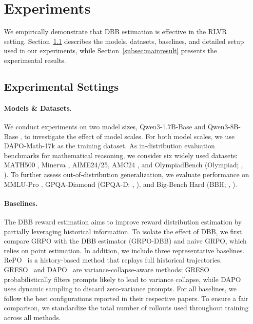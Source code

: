 \section{Experiments}
We empirically demonstrate that DBB estimation is effective in the RLVR setting. Section~\ref{subsec:expsetting} describes the models, datasets, baselines, and detailed setup used in our experiments, while Section~\ref{subsec:mainresult} presents the experimental results.

\subsection{Experimental Settings}
\label{subsec:expsetting}

\paragraph{Models \& Datasets.}
We conduct experiments on two model sizes, Qwen3-1.7B-Base and Qwen3-8B-Base \cite{yang2025qwen3technicalreport}, to investigate the effect of model scales.
For both model scales, we use DAPO-Math-17k \cite{yu2025dapoopensourcellmreinforcement} as the training dataset.
As in-distribution evaluation benchmarks for mathematical reasoning, we consider six widely used datasets: MATH500 \cite{math500}, Minerva \cite{minerva}, AIME24/25, AMC24 \cite{li2024numinamath}, and OlympiadBench (Olympiad; \citeauthor{olympiad}, \citeyear{olympiad}).
To further assess out-of-distribution generalization, we evaluate performance on MMLU-Pro \cite{mmlupro}, GPQA-Diamond (GPQA-D; \citeauthor{gpqa}, \citeyear{gpqa}), and Big-Bench Hard (BBH; \citeauthor{bbh}, \citeyear{bbh}).

\paragraph{Baselines.}
The DBB reward estimation aims to improve reward distribution estimation by partially leveraging historical information.
To isolate the effect of DBB, we first compare GRPO with the DBB estimator (GRPO-DBB) and naive GRPO, which relies on point estimation.
In addition, we include three representative baselines.
RePO~\citep{li2025reporeplayenhancedpolicyoptimization} is a history-based method that replays full historical trajectories.
GRESO~\citep{zheng2025actpaysefficientreinforcement} and DAPO~\citep{yu2025dapoopensourcellmreinforcement} are variance-collapse-aware methods: GRESO probabilistically filters prompts likely to lead to variance collapse, while DAPO uses dynamic sampling to discard zero-variance prompts.
For all baselines, we follow the best configurations reported in their respective papers.
To ensure a fair comparison, we standardize the total number of rollouts used throughout training across all methods.



